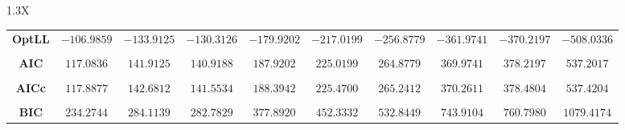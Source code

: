 \documentclass[10pt]{article}
\begin{document}
{\begin{tabularx}{1.3\textwidth}{X}
{\begin{tabular}{cccccccccc}
\cmidrule(r){1-10} \\
 { {\bf OptLL} }& $-106.9859$ & $-133.9125$ & $-130.3126$ & $-179.9202$ & $-217.0199$ & $-256.8779$ & $-361.9741$& $-370.2197$& $-508.0336$ \\
\cmidrule(r){1-10} \\
 { {\bf AIC} }& $117.0836$ & $141.9125$ & $140.9188$ & $187.9202$ & $225.0199$ & $264.8779$ & $369.9741$& $378.2197$& $537.2017$ \\
\cmidrule(r){1-10} \\
 { {\bf AICc} }& $117.8877$ & $142.6812$ & $141.5534$ & $188.3942$ & $225.4700$ & $265.2412$ & $370.2611$& $378.4804$& $537.4204$ \\
\cmidrule(r){1-10} \\
 { {\bf BIC} }& $234.2744$ & $284.1139$ & $282.7829$ & $377.8920$ & $452.3332$ & $532.8449$ & $743.9104$& $760.7980$& $1079.4174$ \\
\bottomrule
\end{tabular}}
\end{tabularx}}

  \vspace{3 cm}

  
\end{document}
